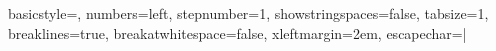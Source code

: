 \usepackage{titlesec}
\titleformat{\paragraph}{\normalfont\normalsize}{\theparagraph}{1em}{}

\usepackage{dirtytalk}

\usepackage[utf8]{inputenc}

\usepackage{multicol}
\usepackage{courier}
\usepackage{listings} %
\lstset
{ %
    basicstyle=\footnotesize\ttfamily,
    numbers=left,
    stepnumber=1,
    showstringspaces=false,
    tabsize=1,
    breaklines=true,
    breakatwhitespace=false,
    xleftmargin=2em,
    escapechar=|
}

\usepackage{tabu}
